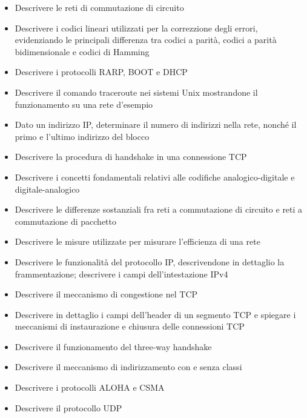 \begin{itemize}
    \item
    Descrivere le reti di commutazione di circuito
    
    \item
    Descrivere i codici lineari utilizzati per la correzzione degli errori, evidenziando le principali differenza tra codici a parità, codici a parità bidimensionale e codici di Hamming
    
    \item
    Descrivere i protocolli RARP, BOOT e DHCP
    
    \item
    Descrivere il comando traceroute nei sistemi Unix mostrandone il funzionamento su una rete d'esempio
    
    \item
    Dato un indirizzo IP, determinare il numero di indirizzi nella rete, nonché il primo e l'ultimo indirizzo del blocco
    
    \item
    Descrivere la procedura di handshake in una connessione TCP
    
    \item
    Descrivere i concetti fondamentali relativi alle codifiche analogico-digitale e digitale-analogico
    
    \item
    Descrivere le differenze sostanziali fra reti a commutazione di circuito e reti a commutazione di pacchetto
    
    \item
    Descrivere le misure utilizzate per misurare l'efficienza di una rete
    
    \item
    Descrivere le funzionalità del protocollo IP, descrivendone in dettaglio la frammentazione; descrivere i campi dell'intestazione IPv4
    
    \item
    Descrivere il meccanismo di congestione nel TCP
    
    \item
    Descrivere in dettaglio i campi dell'header di un segmento TCP e spiegare i meccanismi di instaurazione e chiusura delle connessioni TCP
    
    \item
    Descrivere il funzionamento del three-way handshake
    
    \item
    Descrivere il meccanismo di indirizzamento con e senza classi
    
    \item
    Descrivere i protocolli ALOHA e CSMA
    
    \item
    Descrivere il protocollo UDP
\end{itemize}